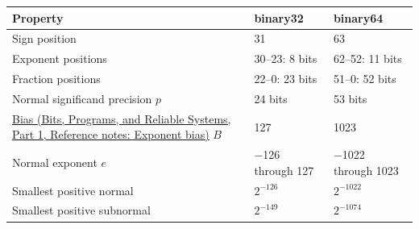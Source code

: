 \documentclass[11pt]{book}
\begin{document}
{\def\LTcaptype{none} %
\begin{longtable}[]{@{}lll@{}}
\toprule\noalign{}
Property & binary32 & binary64 \\
\midrule\noalign{}
\endhead
\bottomrule\noalign{}
\endlastfoot
Sign position & 31 & 63 \\
Exponent positions & 30--23: 8 bits & 62--52: 11 bits \\
Fraction positions & 22--0: 23 bits & 51--0: 52 bits \\
Normal significand precision \(p\) & 24 bits & 53 bits \\
\href{../01-Bits-Programs-and-Reliable-Systems-P01/main.pdf\#appendix-2fae058c82e1}{Bias (Bits, Programs, and Reliable Systems, Part 1, Reference notes: Exponent bias)} \(B\) & 127 & 1023 \\
Normal exponent \(e\) & −126 through 127 & −1022 through 1023 \\
Smallest positive normal & \(2^{-126}\) & \(2^{-1022}\) \\
Smallest positive subnormal & \(2^{-149}\) & \(2^{-1074}\) \\
\end{longtable}
}
\end{document}
